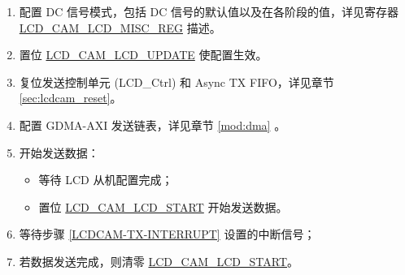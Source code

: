 \documentclass[main\_\_CN.tex]{subfiles}
\begin{document}
\begin{enumerate}
\begin{itemize}
\begin{tiplisting}
\vspace{-2em}
\begin{enumerate}
    \item \label{camlcdctrl-note-1} 定长输出模式是指：LCD 发送完成 \hyperref[fielddesc:LCDCAMLCDDOUTCYCLELEN]{LCD\_CAM\_LCD\_DOUT\_CYCLELEN} 中配置的数据长度即结束 LCD 发送。
    \item \label{camlcdctrl-note-2} 持续输出模式是指：LCD 持续发送数据，直到
    \begin{enumerate}
        \item \hyperref[fielddesc:LCDCAMLCDSTART]{LCD\_CAM\_LCD\_START} 被清零；
        \item 或 \hyperref[fielddesc:LCDCAMLCDRESET]{LCD\_CAM\_LCD\_RESET} 被置位；
        \item 或 GDMA-AXI 中所有数据被发送完。
    \end{enumerate}
\end{enumerate}
\end{tiplisting}

\end{itemize}
    \item 配置 DC 信号模式，包括 DC 信号的默认值以及在各阶段的值，详见寄存器 \hyperref[regdesc:LCDCAMLCDMISCREG]{LCD\_CAM\_LCD\_MISC\_REG} 描述。

    \item 置位 \hyperref[fielddesc:LCDCAMLCDUPDATE]{LCD\_CAM\_LCD\_UPDATE} 使配置生效。

    \item 复位发送控制单元 (LCD\_Ctrl) 和 Async TX FIFO，详见章节 \ref{sec:lcdcam_reset}。

    \item 配置 GDMA-AXI 发送链表，详见章节 \ref{mod:dma} \textit{}。

    \item 开始发送数据：
    \begin{itemize}
        \item 等待 LCD 从机配置完成；
        \item 置位 \hyperref[fielddesc:LCDCAMLCDSTART]{LCD\_CAM\_LCD\_START} 开始发送数据。
    \end{itemize}

    \item 等待步骤 \ref{LCDCAM-TX-INTERRUPT} 设置的中断信号；

    \item 若数据发送完成，则清零 \hyperref[fielddesc:LCDCAMLCDSTART]{LCD\_CAM\_LCD\_START}。
\end{enumerate}
\end{document}
